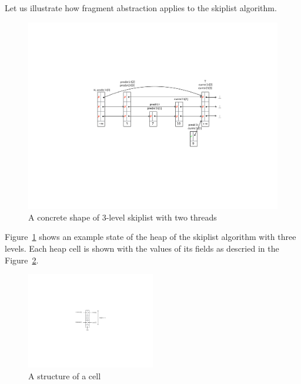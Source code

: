 Let us illustrate how fragment abstraction applies to the skiplist
algorithm.
\begin{figure}
\center  
 \includegraphics[width=1.2\textwidth, trim={7cm 8cm 0.5cm 7.3cm}, clip]{skipshape.pdf}  
 \caption{A concrete shape of 3-level skiplist with two threads}
\label{sl-shape}
\end{figure}


Figure~\ref{sl-shape} shows an example state of the heap of the
skiplist algorithm with three levels. Each heap cell is shown with the values of its fields as descried in the Figure~\ref{skipcell}. %


\begin{figure} 
\vspace{-50pt}
  \begin{center}
 \includegraphics[width=0.5\textwidth, trim={13cm 10cm 13cm 9cm}, clip]{skipcell.pdf}  
    \caption{A structure of a cell}
    \label{skipcell}
  \end{center}
  \vspace{-35pt}
  \vspace{1pt}
\end{figure}


